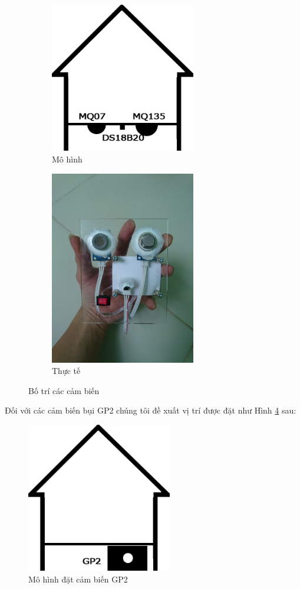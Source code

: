 \begin{figure}[H]
\centering  
  \begin{subfigure}[b]{0.5\textwidth}
    \includegraphics[width=2.5in]{house_sensor}
    \caption[Mô hình]{Mô hình}
    \label{fig:house_sensor}
  \end{subfigure}\hfill
  \begin{subfigure}[b]{0.5\textwidth}
    \includegraphics[width=2.5in]{house_sensor_2}
  	 \caption[Thực tế]{Thực tế}
    \label{fig:house_sensor_2}
  \end{subfigure}
  \caption{Bố trí các cảm biến}\label{fig:botri}
\end{figure}
Đối với các cảm biến bụi GP2 chúng tôi đề xuất vị trí được đặt như Hình \ref{fig:house_dust} sau:
\begin{figure}[H]
\centering    
\includegraphics[width=2.5in]{house_dust}
\caption[Mô hình đặt cảm biến GP2]{Mô hình đặt cảm biến GP2}
\label{fig:house_dust}
\end{figure}

